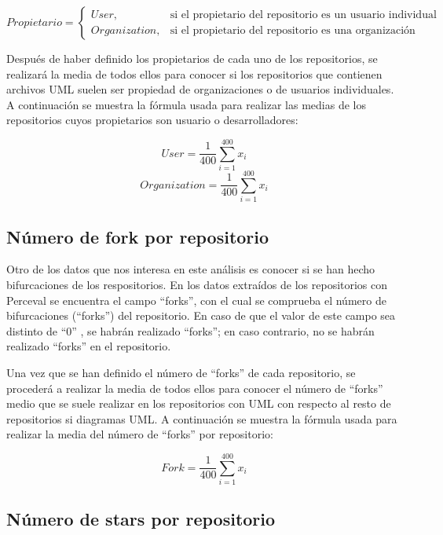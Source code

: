 \documentclass[a4paper, 12pt]{book}
\begin{document}
\begin{equation}
  Propietario =
  \begin{cases}
  User, & \text{si el propietario del repositorio es un usuario individual} \\
  Organization, & \text{si el propietario del repositorio es una organización}
  \end{cases}
\end{equation}

Después de haber definido los propietarios de cada uno de los repositorios, se realizará la media de todos ellos para conocer si los repositorios que contienen archivos UML suelen ser propiedad de organizaciones o de usuarios individuales.
A continuación se muestra la fórmula usada para realizar las medias de los repositorios cuyos propietarios son usuario o desarrolladores:

\[{User} = \frac{1}{400} \sum_{i=1}^{400} x_i\]
\[{Organization} = \frac{1}{400} \sum_{i=1}^{400} x_i\]


\subsection{Número de fork por repositorio} %
\label{sec:Número de fork por repositorio}

Otro de los datos que nos interesa en este análisis es conocer si se han hecho bifurcaciones de los respositorios.
En los datos extraídos de los repositorios con Perceval se encuentra el campo ``forks'', con el cual se comprueba el número de bifurcaciones (``forks'') del repositorio.
En caso de que el valor de este campo sea distinto de ``0'' , se habrán realizado ``forks''; en caso contrario, no se habrán realizado ``forks'' en el repositorio.


Una vez que se han definido el número de ``forks'' de cada repositorio, se procederá a realizar la media de todos ellos para conocer el número de ``forks'' medio que se suele realizar en los repositorios con UML con respecto al resto de repositorios si diagramas UML.
A continuación se muestra la fórmula usada para realizar la media del número de ``forks'' por repositorio:


\[{Fork} = \frac{1}{400} \sum_{i=1}^{400} x_i\]


\subsection{Número de stars por repositorio} %
\label{sec:número de stars por repositorio}
\end{document}
